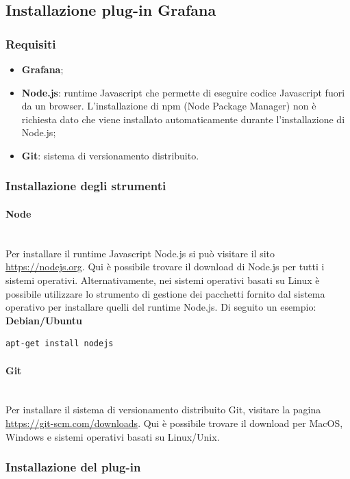 \subsection{Installazione plug-in Grafana}
\subsubsection{Requisiti}
\begin{itemize}
	\item \textbf{Grafana\glo};
	\item \textbf{Node.js}: runtime Javascript che permette di eseguire codice Javascript fuori da un browser. L'installazione di npm (Node Package Manager) non è richiesta dato che viene installato automaticamente durante l'installazione di Node.js;
	\item \textbf{Git}: sistema di versionamento distribuito.
\end{itemize}

\subsubsection{Installazione degli strumenti}

\paragraph{Node}\mbox{}\\ [1mm]
Per installare il runtime Javascript Node.js si può visitare il sito \url{https://nodejs.org}. Qui è possibile trovare il download di Node.js per tutti i sistemi operativi. Alternativamente, nei sistemi operativi basati su Linux è possibile utilizzare lo strumento di gestione dei pacchetti fornito dal sistema operativo per installare quelli del runtime Node.js. Di seguito un esempio:
\textbf{Debian/Ubuntu}
\begin{verbatim}
apt-get install nodejs
\end{verbatim}

\paragraph{Git}\mbox{}\\ [1mm]
Per installare il sistema di versionamento distribuito Git, visitare la pagina \url{https://git-scm.com/downloads}. Qui è possibile trovare il download per MacOS, Windows e sistemi operativi basati su Linux/Unix.

\subsubsection{Installazione del plug-in}
